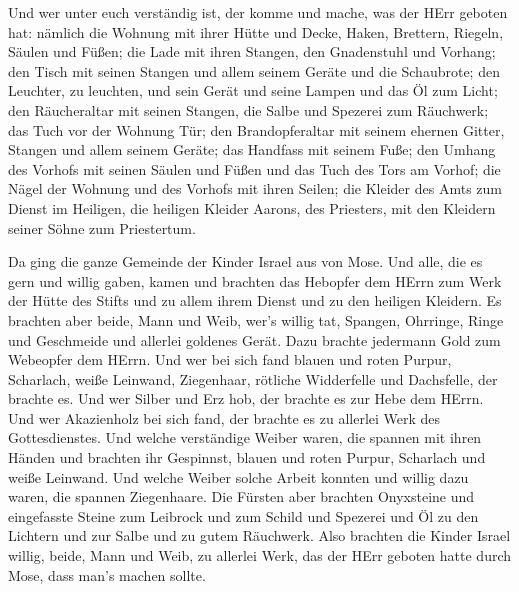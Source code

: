  Und wer unter euch verständig ist, der komme und mache,
was der HErr geboten hat:  nämlich die Wohnung mit ihrer
Hütte und Decke, Haken, Brettern, Riegeln, Säulen und Füßen;
 die Lade mit ihren Stangen, den Gnadenstuhl und Vorhang;
 den Tisch mit seinen Stangen und allem seinem Geräte und
die Schaubrote;  den Leuchter, zu leuchten, und sein Gerät
und seine Lampen und das Öl zum Licht;  den Räucheraltar
mit seinen Stangen, die Salbe und Spezerei zum Räuchwerk; das Tuch vor
der Wohnung Tür;  den Brandopferaltar mit seinem ehernen
Gitter, Stangen und allem seinem Geräte; das Handfass mit seinem Fuße;
 den Umhang des Vorhofs mit seinen Säulen und Füßen und das
Tuch des Tors am Vorhof;  die Nägel der Wohnung und des
Vorhofs mit ihren Seilen;  die Kleider des Amts zum Dienst
im Heiligen, die heiligen Kleider Aarons, des Priesters, mit den
Kleidern seiner Söhne zum Priestertum.

 Da ging die ganze Gemeinde der Kinder Israel aus von Mose.
 Und alle, die es gern und willig gaben, kamen und brachten
das Hebopfer dem HErrn zum Werk der Hütte des Stifts und zu allem ihrem
Dienst und zu den heiligen Kleidern.  Es brachten aber
beide, Mann und Weib, wer's willig tat, Spangen, Ohrringe, Ringe und
Geschmeide und allerlei goldenes Gerät. Dazu brachte jedermann Gold zum
Webeopfer dem HErrn.  Und wer bei sich fand blauen und
roten Purpur, Scharlach, weiße Leinwand, Ziegenhaar, rötliche
Widderfelle und Dachsfelle, der brachte es.  Und wer Silber
und Erz hob, der brachte es zur Hebe dem HErrn. Und wer Akazienholz bei
sich fand, der brachte es zu allerlei Werk des Gottesdienstes.
 Und welche verständige Weiber waren, die spannen mit ihren
Händen und brachten ihr Gespinnst, blauen und roten Purpur, Scharlach
und weiße Leinwand.  Und welche Weiber solche Arbeit
konnten und willig dazu waren, die spannen Ziegenhaare. 
Die Fürsten aber brachten Onyxsteine und eingefasste Steine zum Leibrock
und zum Schild  und Spezerei und Öl zu den Lichtern und zur
Salbe und zu gutem Räuchwerk.  Also brachten die Kinder
Israel willig, beide, Mann und Weib, zu allerlei Werk, das der HErr
geboten hatte durch Mose, dass man's machen sollte.

